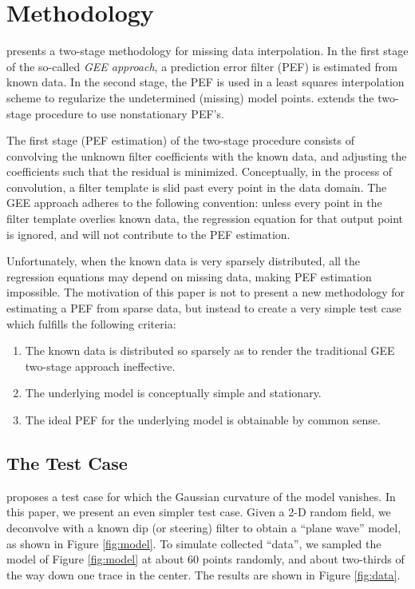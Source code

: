 \section{ Methodology}

 presents a two-stage methodology for missing data interpolation.
In the first stage of the so-called {\em GEE approach}, a prediction error filter (PEF) 
is estimated from known data.
In the second stage, the PEF is used in a least squares interpolation scheme to 
regularize the undetermined (missing) model points.  
extends the two-stage procedure to use nonstationary PEF's.
\par
The first stage (PEF estimation) of the two-stage procedure consists of convolving
the unknown filter coefficients with the known data, and adjusting the coefficients
such that the residual is minimized.  Conceptually, in the process of convolution,
a filter template is slid past every point in the data domain.  The GEE approach adheres to the
following convention: unless every point in the filter template overlies known data, the 
regression equation for that output point is ignored, and will not contribute to 
the PEF estimation.
\par
Unfortunately, when the known data is very sparsely distributed, all the regression
equations may depend on missing data, making PEF estimation impossible.  
The motivation of this paper is not to present a new methodology for estimating a PEF 
from sparse data, but instead to create a very simple test case which fulfills the
following criteria:
\begin{enumerate}
	\item  The known data is distributed so sparsely as to render the traditional 
	       GEE two-stage approach ineffective.
	\item  The underlying model is conceptually simple and stationary.
	\item  The ideal PEF for the underlying model is obtainable by common sense.
\end{enumerate}

\subsection{The Test Case}

 proposes a test case for which the Gaussian curvature
of the model vanishes.  In this paper, we present an even simpler test case.  Given a 
2-D random field, we deconvolve with a known dip (or steering) \cite{Clapp.sep.95.bob1} 
filter to obtain a ``plane wave'' model, as shown in Figure \ref{fig:model}.
To simulate collected ``data'', we sampled the model of Figure \ref{fig:model} at
about 60 points randomly, and about two-thirds of the way down one trace in the center.  
The results are shown in Figure \ref{fig:data}.

